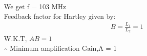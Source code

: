 \begin{enumerate}[label=\thesection.\arabic*.,ref=\thesection.\theenumi]
We get f = 103 MHz\\
Feedback factor for Hartley given by:
\begin{align}
B =\frac{L_1}{L_2}= 1
\end{align}
W.K.T, $AB = 1$\\
$\therefore$ Minimum amplification Gain,A = 1\\
\end{enumerate}
